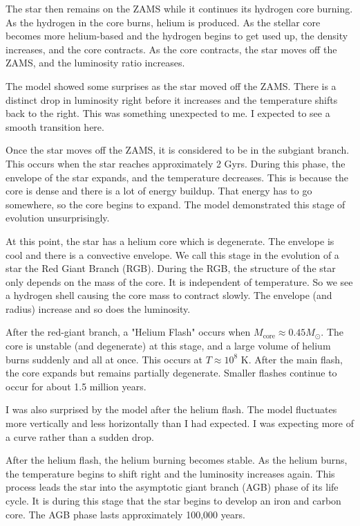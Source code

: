 \documentclass[fleqn,usenatbib]{mnras}
\begin{document}
The star then remains on the ZAMS while it continues its hydrogen core burning. As the hydrogen in the core burns, helium is produced. As the stellar core becomes more helium-based and the hydrogen begins to get used up, the density increases, and the core contracts. As the core contracts, the star moves off the ZAMS, and the luminosity ratio increases.

The model showed some surprises as the star moved off the ZAMS. There is a distinct drop in luminosity right before it increases and the temperature shifts back to the right. This was something unexpected to me. I expected to see a smooth transition here.

Once the star moves off the ZAMS, it is considered to be in the subgiant branch. This occurs when the star reaches approximately 2 Gyrs. During this phase, the envelope of the star expands, and the temperature decreases. This is because the core is dense and there is a lot of energy buildup. That energy has to go somewhere, so the core begins to expand. The model demonstrated this stage of evolution unsurprisingly.

At this point, the star has a helium core which is degenerate. The envelope is cool and there is a convective envelope. We call this stage in the evolution of a star the Red Giant Branch (RGB). During the RGB, the structure of the star only depends on the mass of the core. It is independent of temperature. So we see a hydrogen shell causing the core mass to contract slowly. The envelope (and radius) increase and so does the luminosity.

After the red-giant branch, a "Helium Flash" occurs when $M_{\text{core}} \approx 0.45 M_\odot$. The core is unstable (and degenerate) at this stage, and a large volume of helium burns suddenly and all at once. This occurs at $T \approx 10^8$ K. After the main flash, the core expands but remains partially degenerate. Smaller flashes continue to occur for about 1.5 million years.

I was also surprised by the model after the helium flash. The model fluctuates more vertically and less horizontally than I had expected. I was expecting more of a curve rather than a sudden drop.

After the helium flash, the helium burning becomes stable. As the helium burns, the temperature begins to shift right and the luminosity increases again. This process leads the star into the asymptotic giant branch (AGB) phase of its life cycle. It is during this stage that the star begins to develop an iron and carbon core. The AGB phase lasts approximately 100,000 years.
\end{document}

